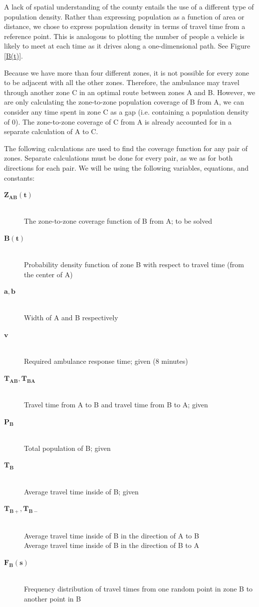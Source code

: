 \documentclass[notitlepage, 12pt]{article}
\begin{document}
A lack of spatial understanding of the county entails the use of a different type of population density. Rather than expressing population as a function of area or distance, we chose to express population density in terms of travel time from a reference point. This is analogous to plotting the number of people a vehicle is likely to meet at each time as it drives along a one-dimensional path. See Figure \ref{B(t)}.

Because we have more than four different zones, it is not possible for every zone to be adjacent with all the other zones. Therefore, the ambulance may travel through another zone C in an optimal route between zones A and B. However, we are only calculating the zone-to-zone population coverage of B from A, we can consider any time spent in zone C as a gap (i.e. containing a population density of 0). The zone-to-zone coverage of C from A is already accounted for in a separate calculation of A to C. 

The following calculations are used to find the coverage function for any pair of zones. Separate calculations must be done for every pair, as we as for both directions for each pair. We will be using the following variables, equations, and constants:

\begin{description}
    \item[$\mathbf{Z_{AB}(t)}$] \hfill \\
    	The zone-to-zone coverage function of B from A; to be solved
    \item[$\mathbf{B(t)}$] \hfill \\
    	Probability density function of zone B with respect to travel time (from the center of A)
   \item[$\mathbf{a, b}$] \hfill \\
    	Width of A and B respectively
    \item[$\mathbf{v}$] \hfill \\
    	Required ambulance response time; given (8 minutes)
    \item[$\mathbf{T_{AB}, T_{BA}}$] \hfill \\
    	Travel time from A to B and travel time from B to A; given
    \item[$\mathbf{P_B}$] \hfill \\
    	Total population of B; given
   \item[$\mathbf{T_B}$] \hfill \\
    	Average travel time inside of B; given
    \item[$\mathbf{T_{B+}, T_{B-}}$] \hfill \\
    	Average travel time inside of B in the direction of A to B\\Average travel time inside of B in the direction of B to A
    \item[$\mathbf{F_B(s)}$] \hfill \\
	  Frequency distribution of travel times from one random point in zone B to another point in B
\end{description}
\end{document}
